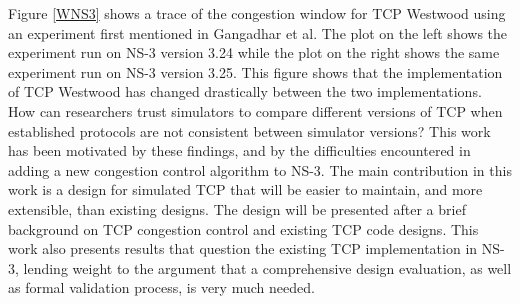 \documentclass[11pt]{ucthesis}
\begin{document}
Figure \ref{WNS3} shows a trace of the congestion window for TCP Westwood using an experiment first mentioned in Gangadhar et al\cite{NS3W}. The plot on the left shows the experiment run on NS-3 version 3.24 while the plot on the right shows the same experiment run on NS-3 version 3.25.  This figure shows that the implementation of TCP Westwood has changed drastically between the two implementations. How can researchers trust simulators to compare different versions of TCP when established protocols are not consistent between simulator versions? This work has been motivated by these findings, and by the difficulties encountered in adding a new congestion control algorithm to NS-3. The main contribution in this work is a design for simulated TCP that will be easier to maintain, and more extensible, than existing designs. The design will be presented after a brief background on TCP congestion control and existing TCP code designs. This work also presents results that question the existing TCP implementation in NS-3, lending weight to the argument that a comprehensive design evaluation, as well as formal validation process, is very much needed. 
\end{document}

